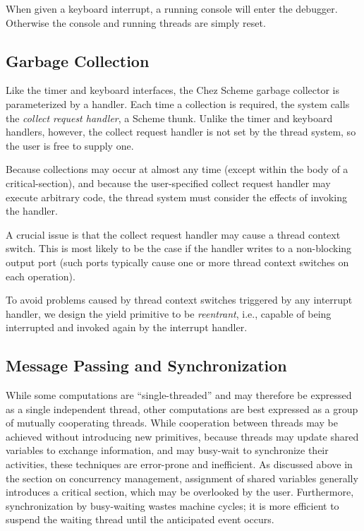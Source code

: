\documentclass{article}
\begin{document}
When given a keyboard interrupt, a running console will enter the
debugger.  Otherwise the console and running threads are simply reset.



\subsection{Garbage Collection}

Like the timer and keyboard interfaces, the Chez Scheme garbage
collector is parameterized by a handler.  Each time a collection is
required, the system calls the {\em collect request handler}, a Scheme
thunk.  Unlike the timer and keyboard handlers, however, the collect
request handler is not set by the thread system, so the user is free
to supply one.

Because collections may occur at almost any time (except within the
body of a {\sf critical-section}), and because the user-specified collect
request handler may execute arbitrary code, the thread system must
consider the effects of invoking the handler.

A crucial issue is that the collect request handler may cause a thread
context switch.  This is most likely to be the case if the handler
writes to a non-blocking output port (such ports typically cause one
or more thread context switches on each operation).

To avoid problems caused by thread context switches triggered by any
interrupt handler, we design the {\sf yield} primitive to be {\em
reentrant}, i.e., capable of being interrupted and invoked again by
the interrupt handler.



\subsection{Message Passing and Synchronization}

While some computations are ``single-threaded'' and may therefore be
expressed as a single independent thread, other computations are best
expressed as a group of mutually cooperating threads.  While
cooperation between threads may be achieved without introducing new
primitives, because threads may update shared variables to exchange
information, and may busy-wait to synchronize their activities, these
techniques are error-prone and inefficient.  As discussed above in the
section on concurrency management, assignment of shared variables
generally introduces a critical section, which may be overlooked by
the user.  Furthermore, synchronization by busy-waiting wastes machine
cycles; it is more efficient to suspend the waiting thread until the
anticipated event occurs.
\end{document}
